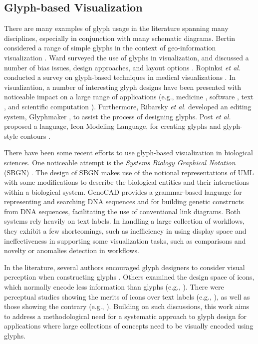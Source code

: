 \subsection{Glyph-based Visualization}
%
There are many examples of glyph usage in the literature spanning many disciplines, especially in conjunction with many schematic diagrams.
Bertin considered a range of simple glyphs in the context of geo-information visualization \cite{bertin83}.
Ward surveyed the use of glyphs in visualization, and discussed a number of bias issues, design approaches, and layout options \cite{ward08}.
Ropinksi \emph{et al.} conducted a survey on glyph-based techniques in medical visualizations \cite{ropinski11}.
In visualization, a number of interesting glyph designs have been presented with noticeable impact on a large range of applications (e.g., 
medicine \cite{Kindlmann06},
software \cite{Chuah98},
text \cite{Rohrer98}, and
scientific computation \cite{Wittenbrink96}).
Furthermore, Ribarsky \emph{et al.} developed an editing system, Glyphmaker \cite{ribarsky94}, to assist the process of designing glyphs.
Post \emph{et al.} proposed a language, Icon Modeling Language, for creating glyphs and glyph-style contours \cite{post95}.

There have been some recent efforts to use glyph-based visualization in biological sciences.
One noticeable attempt is the \emph{Systems Biology Graphical Notation} (SBGN) \cite{lenovere09}.
The design of SBGN makes use of the notional representations of UML with some modifications to describe the biological entities and their interactions within a biological system.
GenoCAD \cite{cai10} provides a grammar-based language for representing and searching DNA sequences and for building genetic constructs from DNA sequences, facilitating the use of conventional link diagrams.
Both systems rely heavily on text labels.
In handling a large collection of workflows, they exhibit a few shortcomings, such as inefficiency in using display space and ineffectiveness in supporting some visualization tasks, such as comparisons and novelty or anomalies detection in workflows.

In the literature, several authors encouraged glyph designers to consider visual perception when constructing glyphs \cite{ward08,karve07}. Others examined the design space of icons, which normally encode less information than glyphs (e.g., \cite{hemenway82,lewis04}). There were perceptual studies showing the merits of icons over text labels (e.g., \cite{muter86,pellegrino77}), as well as those showing the contrary (e.g., \cite{wiedenbeck99}).
Building on such discussions, this work aims to address a methodological need for a systematic approach to glyph design for applications where large collections of concepts need to be visually encoded using glyphs.

